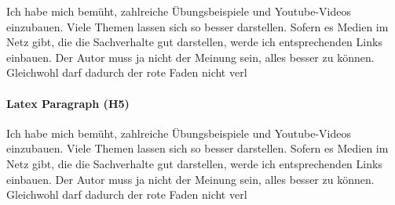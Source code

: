 \documentclass[
  oneside]{book}
\begin{document}
Ich habe mich bemüht, zahlreiche Übungsbeispiele und Youtube-Videos einzubauen. Viele Themen lassen sich so besser darstellen. Sofern es Medien im Netz gibt, die die Sachverhalte gut darstellen, werde ich entsprechenden Links einbauen. Der Autor muss ja nicht der Meinung sein, alles besser zu können. Gleichwohl darf dadurch der rote Faden nicht verl

\hypertarget{latex-paragraph-h5}{%
\paragraph{Latex Paragraph (H5)}\label{latex-paragraph-h5}}

Ich habe mich bemüht, zahlreiche Übungsbeispiele und Youtube-Videos einzubauen. Viele Themen lassen sich so besser darstellen. Sofern es Medien im Netz gibt, die die Sachverhalte gut darstellen, werde ich entsprechenden Links einbauen. Der Autor muss ja nicht der Meinung sein, alles besser zu können. Gleichwohl darf dadurch der rote Faden nicht verl

  
\end{document}
